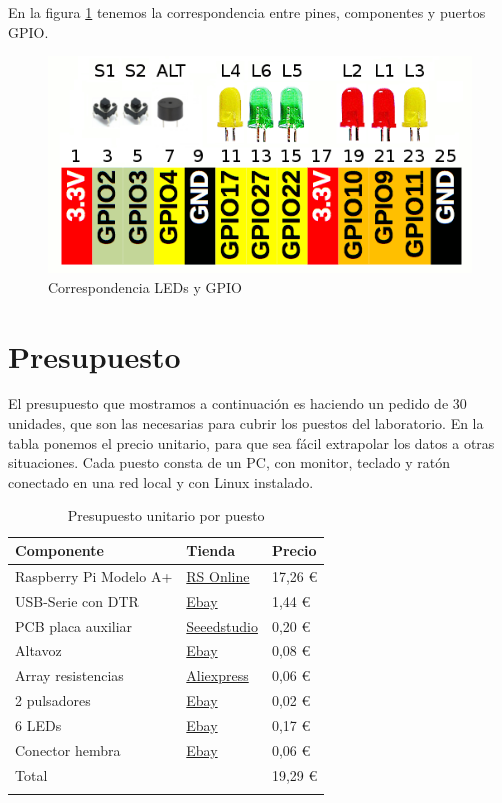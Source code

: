 En la figura \ref{fig:pinout2} tenemos la correspondencia entre pines, componentes
y puertos GPIO.

\begin{figure}[h]
  \centering
    \includegraphics[width=14cm]{graphs/RaspberryGPIOaux.png}
  \caption{Correspondencia LEDs y GPIO}
  \label{fig:pinout2}
\end{figure}

\section{Presupuesto}

El presupuesto que mostramos a continuación es haciendo un pedido de 30 unidades, que
son las necesarias para cubrir los puestos del laboratorio. En la tabla ponemos
el precio unitario, para que sea fácil extrapolar los datos a otras situaciones. Cada
puesto consta de un PC, con monitor, teclado y ratón conectado en una red local y
con Linux instalado.

\begin{longtable}{ p{6cm} | p{4cm} | p{3cm}}
\hline
{\bf Componente} & {\bf Tienda} & {\bf Precio} \\ \hline
Raspberry Pi Modelo A+ & \href{http://es.rs-online.com/web/p/kits-de-desarrollo-de-procesador-y-microcontrolador/8332699/}{RS Online} & 17,26 € \\
USB-Serie con DTR & \href{http://www.ebay.com/itm//400565980256}{Ebay} & 1,44 € \\
PCB placa auxiliar & \href{http://seeedstudio.com/service/index.php?r=pcb}{Seeedstudio} & 0,20 € \\
Altavoz & \href{http://www.ebay.com/itm/261583913099}{Ebay} & 0,08 € \\
Array resistencias & \href{http://www.aliexpress.com/item//1936805890.html}{Aliexpress} & 0,06 € \\
2 pulsadores & \href{http://www.ebay.com/itm/261621014025}{Ebay} & 0,02 € \\
6 LEDs & \href{http://www.ebay.com/itm/281410599537}{Ebay} & 0,17 € \\
Conector hembra & \href{http://www.ebay.com/itm/271427325429}{Ebay} & 0,06 € \\ \hline
Total &  & 19,29 € \\ \hline
\caption{Presupuesto unitario por puesto}
\label{tab:presupuesto}
\end{longtable}

